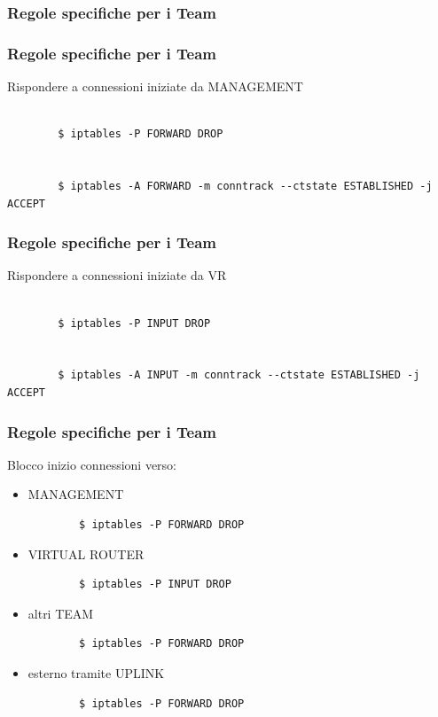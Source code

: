 \documentclass{beamer}
\begin{document}
\subsubsection{Regole specifiche per i Team}
\begin{frame}[fragile]
    \frametitle{Regole specifiche per i Team}
    Rispondere a connessioni iniziate da MANAGEMENT
    \\~\\
    \begin{lstlisting}
        $ iptables -P FORWARD DROP
        
        
        $ iptables -A FORWARD -m conntrack --ctstate ESTABLISHED -j ACCEPT
    \end{lstlisting}

\end{frame}
\begin{frame}[fragile]
    \frametitle{Regole specifiche per i Team}
    Rispondere a connessioni iniziate da VR
    \\~\\
    \begin{lstlisting}
        $ iptables -P INPUT DROP
        
        
        $ iptables -A INPUT -m conntrack --ctstate ESTABLISHED -j ACCEPT
    \end{lstlisting}

\end{frame}

\begin{frame}[fragile]
    \frametitle{Regole specifiche per i Team}
    Blocco inizio connessioni verso:
    \begin{itemize}
        \item MANAGEMENT
            \begin{lstlisting}
        $ iptables -P FORWARD DROP
            \end{lstlisting}
        \item VIRTUAL ROUTER
            \begin{lstlisting}
        $ iptables -P INPUT DROP  
            \end{lstlisting}
        \item altri TEAM
            \begin{lstlisting}
        $ iptables -P FORWARD DROP
            \end{lstlisting}
        \item esterno tramite UPLINK
            \begin{lstlisting}
        $ iptables -P FORWARD DROP
            \end{lstlisting}
    \end{itemize}
\end{frame}
\end{document}
